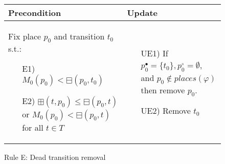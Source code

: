 \begin{figure}[h!]
    \vspace{5mm}

    \begin{adjustbox}{center}
        \begin{tabular}{|p{79mm}|p{54mm}|} \hline
        Precondition & Update \\ \hline
        Fix place $p_0$ and transition $t_0$ s.t.:
        \begin{itemize}[leftmargin=10mm]
            \item[E1)] $M_0(p_0)<\boxminus(p_0, t_0)$
            \item[E2)] $\boxplus(t,p_0)\leq\boxminus(p_0, t)$ or $M_0(p_0)<\boxminus(p_0, t)$ for all $t\in T$
        \end{itemize} &
        \begin{itemize}[leftmargin=10mm]
            \item[UE1)] If $p_0^\bullet=\{t_0\},p_0^\circ=\emptyset$, and $p_0\notin places(\varphi)$ then remove $p_0$.
            \item[UE2)] Remove $t_0$
        \end{itemize} \\ \hline
        \end{tabular}
    \end{adjustbox}
    \caption{Rule E: Dead transition removal}
    \label{fig:rule_e}
\end{figure}